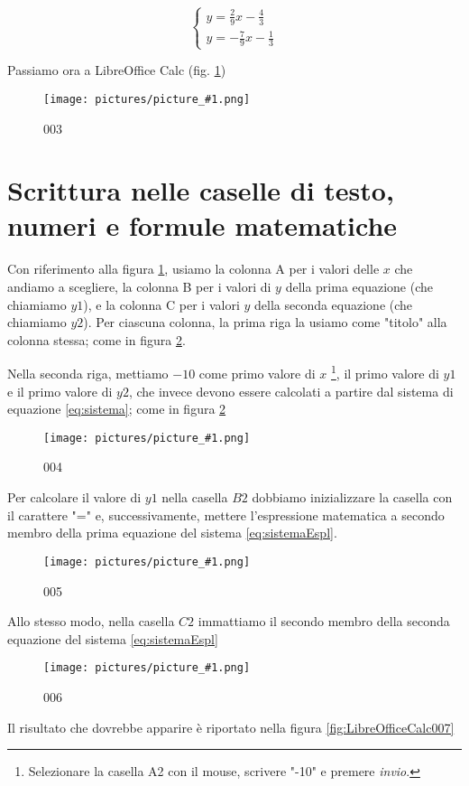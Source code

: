 \documentclass[17pt]{extarticle}
\newcommand{\pict}[1]{
\begin{figure}[h!]		
	\centering
   	\texttt{[image: pictures/picture\_\#1.png]}
  	\caption{#1}
   	\label{fig:LibreOfficeCalc#1}
\end{figure}
}
\begin{document}
\begin{equation}\label{eq:sistemaEspl}
  	\begin{cases}
		y = \frac{2}{9}x - \frac{4}{3}\\
		y = -\frac{7}{9}x - \frac{1}{3}
	\end{cases}
\end{equation}


Passiamo ora a LibreOffice Calc (fig. \ref{fig:LibreOfficeCalc003})
%

\pict{003}

\newpage

\section{Scrittura nelle caselle di testo, numeri e formule matematiche}

Con riferimento alla figura \ref{fig:LibreOfficeCalc003}, usiamo la colonna A per i valori delle $x$ che andiamo a scegliere, la colonna B per i valori di $y$ della prima equazione (che chiamiamo $y1$), e la colonna C per i valori $y$ della seconda equazione (che chiamiamo $y2$). Per ciascuna colonna, la prima riga la usiamo come "titolo" alla colonna stessa; come in figura \ref{fig:LibreOfficeCalc004}.

Nella seconda riga, mettiamo $-10$  come primo valore di $x$ \footnote{Selezionare la casella A2 con il mouse, scrivere "-10" e premere \emph{invio}. }, il primo valore di $y1$ e il primo valore di $y2$, che invece devono essere calcolati a partire dal sistema di equazione \ref{eq:sistema}; come in figura \ref{fig:LibreOfficeCalc004}

%
\pict{004}

Per calcolare il valore di $y1$ nella casella $B2$ dobbiamo inizializzare la casella con il carattere "=" e, successivamente, mettere l'espressione matematica a secondo membro della prima equazione del sistema \ref{eq:sistemaEspl}.

%
\pict{005}

Allo stesso modo, nella casella $C2$ immattiamo il secondo membro della seconda equazione del sistema \ref{eq:sistemaEspl}

%
\pict{006}


Il risultato che dovrebbe apparire è riportato nella figura \ref{fig:LibreOfficeCalc007}
\end{document}
